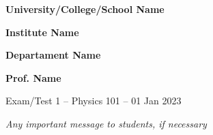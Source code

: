 \documentclass[9pt,twocolumn,english]{article}
\begin{document}
\textbf{University/College/School Name}

\textbf{Institute Name}

\textbf{Departament Name}

\textbf{Prof. Name}

\medskip{}

Exam/Test 1 -- Physics 101 -- 01 Jan 2023

\medskip{}

\emph{Any important message to students, if necessary}

\medskip{}
\end{document}
